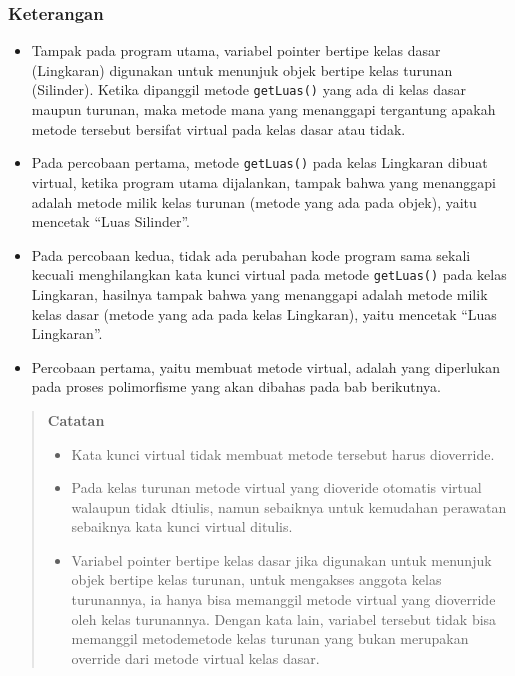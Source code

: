 \subsubsection*{Keterangan}

\begin{itemize}

\item
  Tampak pada program utama, variabel pointer bertipe kelas dasar
  (Lingkaran) digunakan untuk menunjuk objek bertipe kelas turunan
  (Silinder). Ketika dipanggil metode \texttt{getLuas()} yang ada di
  kelas dasar maupun turunan, maka metode mana yang menanggapi
  tergantung apakah metode tersebut bersifat virtual pada kelas dasar
  atau tidak.
\item
  Pada percobaan pertama, metode \texttt{getLuas()} pada kelas Lingkaran
  dibuat virtual, ketika program utama dijalankan, tampak bahwa yang
  menanggapi adalah metode milik kelas turunan (metode yang ada pada
  objek), yaitu mencetak ``Luas Silinder''.
\item
  Pada percobaan kedua, tidak ada perubahan kode program sama sekali
  kecuali menghilangkan kata kunci virtual pada metode
  \texttt{getLuas()} pada kelas Lingkaran, hasilnya tampak bahwa yang
  menanggapi adalah metode milik kelas dasar (metode yang ada pada kelas
  Lingkaran), yaitu mencetak ``Luas Lingkaran''.
\item
  Percobaan pertama, yaitu membuat metode virtual, adalah yang
  diperlukan pada proses polimorfisme yang akan dibahas pada bab
  berikutnya.
\end{itemize}

\begin{quotation}
 {\LARGE {}} 	\textbf{Catatan} 
	\begin{itemize}
		\item [\ding{45}] Kata
		kunci virtual tidak membuat metode tersebut harus dioverride.
		\item [\ding{45}] Pada kelas turunan metode virtual yang dioveride
		otomatis virtual walaupun tidak dtiulis, namun sebaiknya untuk kemudahan
		perawatan sebaiknya kata kunci virtual ditulis.
		\item [\ding{45}] Variabel pointer bertipe kelas dasar jika digunakan untuk menunjuk objek
		bertipe kelas turunan, untuk mengakses anggota kelas turunannya, ia
		hanya bisa memanggil metode virtual yang dioverride oleh kelas
		turunannya. Dengan kata lain, variabel tersebut tidak bisa memanggil
		metodemetode kelas turunan yang bukan merupakan override dari metode
		virtual kelas dasar.
	\end{itemize}
\end{quotation}
 

